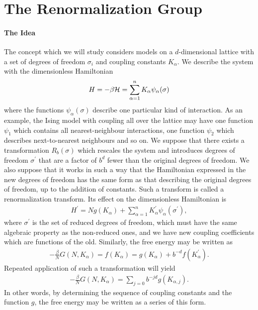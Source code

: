 \section{The Renormalization Group}

\paragraph{The Idea}
The concept which we will study considers models on a $d$-dimensional lattice with a set of degrees of freedom $\sigma_{i}$ and coupling constants $K_{\alpha}$. We describe the system with the dimensionless Hamiltonian
\begin{align*}
	H = -\beta\mathcal{H} = \sum\limits_{\alpha = 1}^{n}K_{\alpha}\psi_{\alpha}(\sigma)
\end{align*}
where the functions $\psi_{\alpha}(\sigma)$ describe one particular kind of interaction. As an example, the Ising model with coupling all over the lattice may have one function $\psi_{1}$ which contains all nearest-neighbour interactions, one function $\psi_{2}$ which describes next-to-nearest neighbours and so on. We suppose that there exists a transformation $R_{b}(\sigma)$ which rescales the system and introduces degrees of freedom $\sigma^{\prime}$ that are a factor of $b^{d}$ fewer than the original degrees of freedom. We also suppose that it works in such a way that the Hamiltonian expressed in the new degrees of freedom has the same form as that describing the original degrees of freedom, up to the addition of constants. Such a transform is called a renormalization transform. Its effect on the dimensionless Hamiltonian is
\begin{align*}
	H^{\prime} = Ng(K_{\alpha}) + \sum\limits_{\alpha = 1}^{n}K_{\alpha}^{\prime}\psi_{\alpha}(\sigma^{\prime}),
\end{align*}
where $\sigma^{\prime}$ is the set of reduced degrees of freedom, which must have the same algebraic property as the non-reduced ones, and we have new coupling coefficients which are functions of the old. Similarly, the free energy may be written as
\begin{align*}
	-\frac{\beta}{N}G\left(N, K_{\alpha}\right) = f\left(K_{\alpha}\right) = g(K_{\alpha}) + b^{-d}f\left(K_{\alpha}^{\prime}\right).
\end{align*}
Repeated application of such a transformation will yield
\begin{align*}
	-\frac{\beta}{N}G\left(N, K_{\alpha}\right) = \sum\limits_{j = 0}b^{-jd}g(K_{\alpha, j}).
\end{align*}
In other words, by determining the sequence of coupling constants and the function $g$, the free energy may be written as a series of this form.

